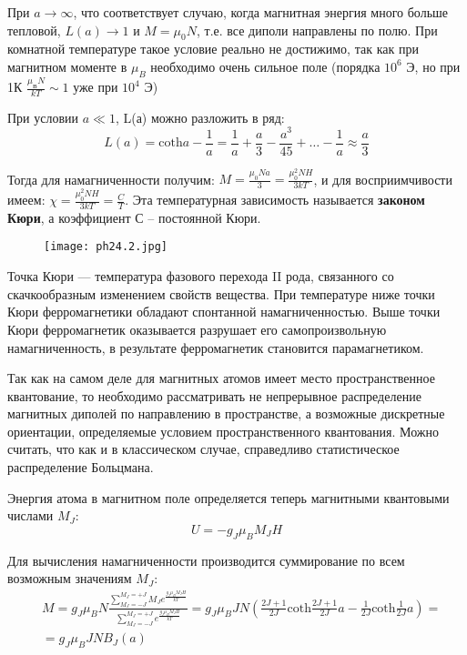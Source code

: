 При $a\rightarrow \infty$, что соответствует случаю, когда магнитная энергия много больше тепловой, $L(a)\rightarrow1 \text{ и } M=\mu_{0} N$, т.е. все диполи направлены по полю. При комнатной температуре такое условие реально не достижимо, так как при магнитном моменте в $\mu_B$ необходимо очень сильное поле (порядка $10^6$ Э, но при 1К $\frac{\mu_{В} N} {kT} \sim 1$ уже при  $10^4 $ Э)


При условии $a\ll 1$, L(а) можно разложить в ряд: 
$$ L(a)=\mathrm{coth} a-\frac{1}{a}=\frac{1}{a}+\frac{a}{3}-\frac{a^3}{45}+\ldots-\frac{1}{a} \approx \frac{a}{3} $$

Тогда для намагниченности получим: $ M = \frac{\mu_0 N a}{3} = \frac{\mu_0^2 N H }{3kT} $, и для восприимчивости имеем: $ \chi = \frac{\mu_0^2 N H }{3kT} = \frac{C}{T} $. Эта температурная зависимость называется \textbf{законом Кюри}, а коэффициент С – постоянной Кюри. 
\begin{figure}[h!]
    \centering
    \texttt{[image: ph24.2.jpg]}
\end{figure}

Точка Кюри --- температура фазового перехода II рода, связанного со скачкообразным изменением свойств вещества. При температуре ниже точки Кюри ферромагнетики обладают спонтанной намагниченностью. Выше точки Кюри ферромагнетик оказывается разрушает его самопроизвольную намагниченность, в результате ферромагнетик становится парамагнетиком.


Так как на самом деле для магнитных атомов имеет место пространственное квантование, то необходимо рассматривать не непрерывное распределение магнитных диполей по направлению в пространстве, а возможные дискретные ориентации, определяемые условием пространственного квантования. Можно считать, что как и в классическом случае, справедливо статистическое распределение Больцмана.


Энергия атома в магнитном поле определяется теперь магнитными квантовыми числами $M_J$: $$U = - g_J \mu_B M_J H $$


Для вычисления намагниченности производится суммирование по всем возможным значениям $M_J$:
$$
\begin{aligned}
    & M=g_J \mu_B N \frac{\sum \limits_{M_J=-J}^{M_J=+J} M_J e^{\frac{g_{J} \mu_B M_J H}{k T}}}{\sum \limits_{M_J=-J}^{M_J=+J} e^{\frac{g_J \mu_B M_J H}{k T}}}=g_J \mu_B J N\left(\frac{2 J+1}{2 J} \mathrm{coth} \frac{2 J+1}{2 J} a-\frac{1}{2 J} \mathrm{coth} \frac{1}{2 J} a\right)= \\
    & =g_J \mu_B J N B_J(a)
\end{aligned}$$ 

